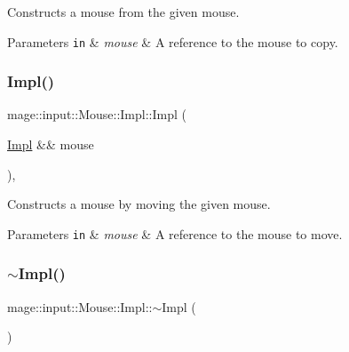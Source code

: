 Constructs a mouse from the given mouse.


\begin{DoxyParams}[1]{Parameters}
\mbox{\tt in}  & {\em mouse} & A reference to the mouse to copy. \\
\hline
\end{DoxyParams}
\mbox{\label{classmage_1_1input_1_1_mouse_1_1_impl_a8eed1c46d32964cb28b999b28c39a2b7}} 
\subsubsection{\texorpdfstring{Impl()}{Impl()}\hspace{0.1cm}{\footnotesize\ttfamily [3/3]}}
{\footnotesize\ttfamily mage\+::input\+::\+Mouse\+::\+Impl\+::\+Impl (\begin{DoxyParamCaption}\item[{\mbox{\hyperlink{classmage_1_1input_1_1_mouse_1_1_impl}{Impl}} \&\&}]{mouse }\end{DoxyParamCaption})\hspace{0.3cm}{\ttfamily [default]}, {\ttfamily [noexcept]}}

Constructs a mouse by moving the given mouse.


\begin{DoxyParams}[1]{Parameters}
\mbox{\tt in}  & {\em mouse} & A reference to the mouse to move. \\
\hline
\end{DoxyParams}
\mbox{\label{classmage_1_1input_1_1_mouse_1_1_impl_a0e1f64d2fadbd25d216e0495d141b867}} 
\subsubsection{\texorpdfstring{$\sim$\+Impl()}{~Impl()}}
{\footnotesize\ttfamily mage\+::input\+::\+Mouse\+::\+Impl\+::$\sim$\+Impl (\begin{DoxyParamCaption}{ }\end{DoxyParamCaption})\hspace{0.3cm}{\ttfamily [default]}}

